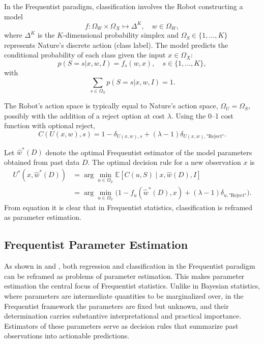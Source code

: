 In the Frequentist paradigm, classification involves the Robot constructing a model
\begin{equation}
	f: \Omega_W \times \Omega_X \mapsto \Delta^K, \quad w \in \Omega_W,
\end{equation}
where $\Delta^K$ is the $K$-dimensional probability simplex and $\Omega_S \in \{1,\dots,K\}$ represents Nature's discrete action (class label). The model predicts the conditional probability of each class given the input $x \in \Omega_X$:
\begin{equation}
	p(S = s | x, w, I) = f_s(w, x), \quad s \in \{1,\dots,K\},
\end{equation}
with
\begin{equation}
	\sum_{s\in \Omega_S} p(S = s | x, w, I) = 1.
\end{equation}

The Robot's action space is typically equal to Nature's action space, $\Omega_U = \Omega_S$, possibly with the addition of a reject option at cost $\lambda$. Using the 0--1 cost function with optional reject,
\begin{equation}
	C(U(x,w), s) = 1 - \delta_{U(x,w),s} + (\lambda-1)\delta_{U(x,w), \text{"Reject"}}.
\end{equation}

Let $\hat{w}^*(D)$ denote the optimal Frequentist estimator of the model parameters obtained from past data $D$. The optimal decision rule for a new observation $x$ is
\begin{equation}
	\begin{split}
		U^*(x, \hat{w}^*(D)) &= \arg\min_{u \in \Omega_U} \mathbb{E}[C(u, S) \mid x, \hat{w}(D), I] \\
		&= \arg\min_{u \in \Omega_U} \Big(1 - f_{u}(\hat{w}^*(D), x) + (\lambda-1)\delta_{u, \text{"Reject"}}\Big).
	\end{split}
	\label{freq:decision_classification}
\end{equation}
From equation  it is clear that in Frequentist statistics, classification is reframed as parameter estimation.


\subsection{Frequentist Parameter Estimation}
\label{chp:frequentist_parameter_estimation}
As shown in  and , both regression and classification in the Frequentist paradigm can be reframed as problems of parameter estimation. This makes parameter estimation the central focus of Frequentist statistics. Unlike in Bayesian statistics, where parameters are intermediate quantities to be marginalized over, in the Frequentist framework the parameters are fixed but unknown, and their determination carries substantive interpretational and practical importance. Estimators of these parameters serve as decision rules that summarize past observations into actionable predictions.

